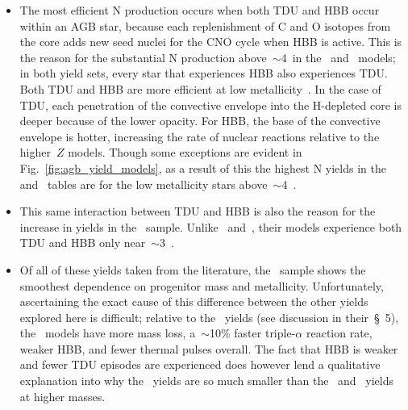 \documentclass[ms.tex]{subfiles}
\begin{document}
\begin{itemize}
\begin{itemize}
		\item The most efficient N production occurs when both TDU and HBB 
		occur within an AGB star, because each replenishment of C and O 
		isotopes from the core adds new seed nuclei for the CNO cycle when HBB 
		is active. 
		This is the reason for the substantial N production 
		above~$\sim$4~\msun in the~\citet{Karakas2010} and~\citet{Karakas2016} 
		models; in both yield sets, every star that experiences HBB also 
		experiences TDU. 
		Both TDU and HBB are more efficient at low metallicity~\citep[see 
		discussion in][]{Ventura2013}. 
		In the case of TDU, each penetration of the convective envelope into 
		the H-depleted core is deeper because of the lower opacity. 
		For HBB, the base of the convective envelope is hotter, increasing the 
		rate of nuclear reactions relative to the higher~$Z$ models. 
		Though some exceptions are evident in Fig.~\ref{fig:agb_yield_models}, 
		as a result of this the highest N yields in the~\citet{Karakas2010} 
		and~\citet{Karakas2016} tables are for the low metallicity stars 
		above~$\sim$4~\msun. 

		\item This same interaction between TDU and HBB is also the reason for 
		the increase in yields in the~\citet{Ventura2013} sample. 
		Unlike~\citet{Karakas2010} and~\citet{Karakas2016}, their models 
		experience both TDU and HBB only near~$\sim$3~\msun. 

		\item Of all of these yields taken from the literature, 
		the~\citet{Cristallo2011, Cristallo2015} sample shows the smoothest 
		dependence on progenitor mass and metallicity. 
		Unfortunately, ascertaining the exact cause of this difference between 
		the other yields explored here is difficult; relative to 
		the~\citet{Karakas2016} yields (see discussion in their~\S~5), 
		the~\citet{Cristallo2011, Cristallo2015} models have more mass loss, 
		a~$\sim$10\% faster triple-$\alpha$ reaction rate, weaker HBB, and 
		fewer thermal pulses overall. 
		The fact that HBB is weaker and fewer TDU episodes are experienced does 
		however lend a qualitative explanation into why 
		the~\citet{Cristallo2011, Cristallo2015} yields are so much smaller 
		than the~\citet{Karakas2010} and~\citet{Karakas2016} yields at higher 
		masses. 
	\end{itemize} 

\end{itemize} 
\end{document}
